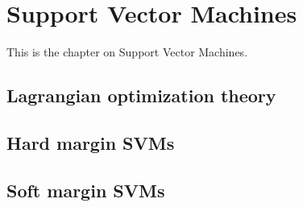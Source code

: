 \documentclass[../../LabBook]{subfiles}
\begin{document}
\section{Support Vector Machines}
This is the chapter on Support Vector Machines.
\subsection{Lagrangian optimization theory}
\subsection{Hard margin SVMs}
\subsection{Soft margin SVMs}
\end{document}
